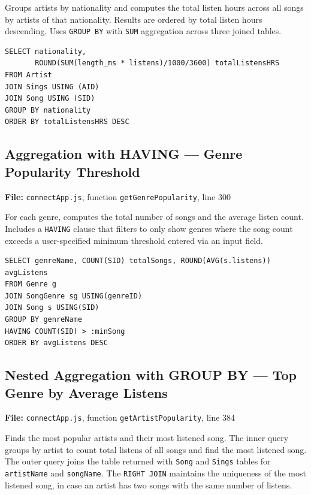 \documentclass{article}
\begin{document}
Groups artists by nationality and computes the total listen hours across all
songs by artists of that nationality. Results are ordered by total listen hours
descending. Uses \texttt{GROUP BY} with \texttt{SUM} aggregation across three
joined tables.

\begin{lstlisting}
SELECT nationality,
       ROUND(SUM(length_ms * listens)/1000/3600) totalListensHRS
FROM Artist
JOIN Sings USING (AID)
JOIN Song USING (SID)
GROUP BY nationality
ORDER BY totalListensHRS DESC
\end{lstlisting}

\subsection{Aggregation with HAVING --- Genre Popularity Threshold}

\textbf{File:} \texttt{connectApp.js}, function \texttt{getGenrePopularity}, line 300

For each genre, computes the total number of songs and the average listen count.
Includes a \texttt{HAVING} clause that filters to only show genres where the
song count exceeds a user-specified minimum threshold entered via an input field.

\begin{lstlisting}
SELECT genreName, COUNT(SID) totalSongs, ROUND(AVG(s.listens)) avgListens
FROM Genre g
JOIN SongGenre sg USING(genreID)
JOIN Song s USING(SID)
GROUP BY genreName
HAVING COUNT(SID) > :minSong
ORDER BY avgListens DESC
\end{lstlisting}

\subsection{Nested Aggregation with GROUP BY --- Top Genre by Average Listens}

\textbf{File:} \texttt{connectApp.js}, function \texttt{getArtistPopularity}, line 384

Finds the most popular artists and their most listened song. The inner query groups by artist to count total listens of all songs and find the most listened song. The outer query joins the table returned with \texttt{Song} and \texttt{Sings} tables for \texttt{artistName} and \texttt{songName}. The \texttt{RIGHT JOIN} maintains the uniqueness of the most listened song, in case an artist has two songs with the same number of listens.
\end{document}
